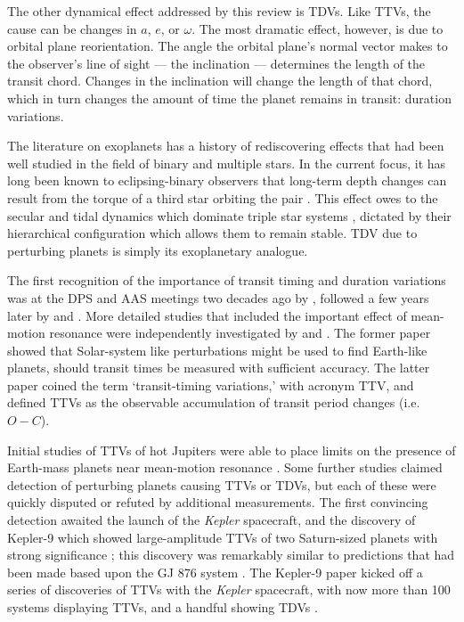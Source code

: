 \documentclass[graybox,natbib,nosecnum]{svmult}
\begin{document}
The other dynamical effect addressed by this review is TDVs.  Like TTVs, the cause can be changes in $a$, $e$, or $\omega$.  The most dramatic effect, however, is due to orbital plane reorientation.  The angle the orbital plane's normal vector makes to the observer's line of sight --- the inclination --- determines the length of the transit chord.  Changes in the inclination will change the length of that chord, which in turn changes the amount of time the planet remains in transit: duration variations. 

The literature on exoplanets has a history of rediscovering effects that had been well studied in the field of binary and multiple stars.  In the current focus, it has long been known to eclipsing-binary observers that long-term depth changes can result from the torque of a third star orbiting the pair \citep{1971Mayer}.  This effect owes to the secular and tidal dynamics which dominate triple star systems \citep{2003A&A...398.1091B}, dictated by their hierarchical configuration which allows them to remain stable. TDV due to perturbing planets is simply its exoplanetary analogue\citep{2002ApJ...564.1019M}.

The first recognition of the importance of transit timing and duration variations was at the DPS and AAS meetings two decades ago by \citet{1996DPS....28.1208D,1996BAAS...28.1112D}, followed a few years later by \citet{2002ApJ...564.1019M} and \citet{Schneider2003,Schneider2004}.  More detailed studies that included the important effect of mean-motion resonance were independently investigated by \citet{2005Sci...307.1288H} and \citet{2005MNRAS.359..567A}.  The former paper showed that Solar-system like perturbations might be used to find Earth-like planets, should transit times be measured with sufficient accuracy.  The latter paper coined the term `transit-timing variations,' with acronym TTV, and defined TTVs as the observable accumulation of transit period changes (i.e.\ $O-C$).

Initial studies of TTVs of hot Jupiters were able to place limits on the presence of Earth-mass planets near mean-motion resonance \citep{2005MNRAS.364L..96S}.  Some further studies claimed detection of perturbing planets causing TTVs or TDVs, but each of these were quickly disputed or refuted by additional measurements.  The first convincing detection awaited the launch of the \emph{Kepler} spacecraft, and the discovery of Kepler-9 which showed large-amplitude TTVs of two Saturn-sized planets with strong significance \citep{2010Sci...330...51H}; this discovery was remarkably similar to predictions that had been made based upon the GJ 876 system \citep{2005MNRAS.359..567A}.  The Kepler-9 paper kicked off a series of discoveries of TTVs with the \emph{Kepler} spacecraft, with now more than 100 systems displaying TTVs, and a handful showing TDVs \citep{2016ApJS..225....9H}.
\end{document}
